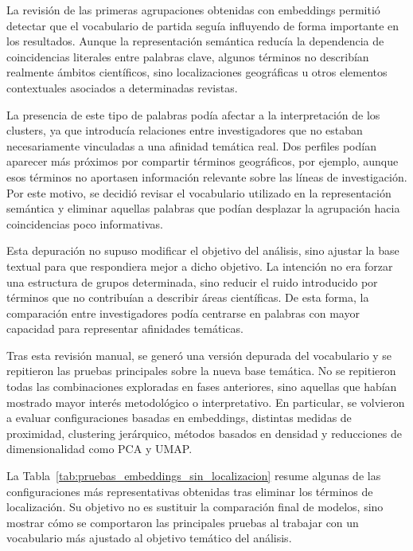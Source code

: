 \documentclass[11pt,spanish,listoffigures,listoftables]{tfgetsinf}
\begin{document}
La revisión de las primeras agrupaciones obtenidas con embeddings permitió detectar que el vocabulario de partida seguía influyendo de forma importante en los resultados. Aunque la representación semántica reducía la dependencia de coincidencias literales entre palabras clave, algunos términos no describían realmente ámbitos científicos, sino localizaciones geográficas u otros elementos contextuales asociados a determinadas revistas.

La presencia de este tipo de palabras podía afectar a la interpretación de los clusters, ya que introducía relaciones entre investigadores que no estaban necesariamente vinculadas a una afinidad temática real. Dos perfiles podían aparecer más próximos por compartir términos geográficos, por ejemplo, aunque esos términos no aportasen información relevante sobre las líneas de investigación. Por este motivo, se decidió revisar el vocabulario utilizado en la representación semántica y eliminar aquellas palabras que podían desplazar la agrupación hacia coincidencias poco informativas.

Esta depuración no supuso modificar el objetivo del análisis, sino ajustar la base textual para que respondiera mejor a dicho objetivo. La intención no era forzar una estructura de grupos determinada, sino reducir el ruido introducido por términos que no contribuían a describir áreas científicas. De esta forma, la comparación entre investigadores podía centrarse en palabras con mayor capacidad para representar afinidades temáticas.

Tras esta revisión manual, se generó una versión depurada del vocabulario y se repitieron las pruebas principales sobre la nueva base temática. No se repitieron todas las combinaciones exploradas en fases anteriores, sino aquellas que habían mostrado mayor interés metodológico o interpretativo. En particular, se volvieron a evaluar configuraciones basadas en embeddings, distintas medidas de proximidad, clustering jerárquico, métodos basados en densidad y reducciones de dimensionalidad como PCA y UMAP.

La Tabla~\ref{tab:pruebas_embeddings_sin_localizacion} resume algunas de las configuraciones más representativas obtenidas tras eliminar los términos de localización. Su objetivo no es sustituir la comparación final de modelos, sino mostrar cómo se comportaron las principales pruebas al trabajar con un vocabulario más ajustado al objetivo temático del análisis.
\end{document}
